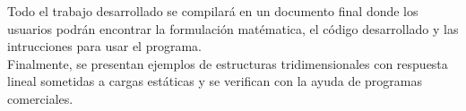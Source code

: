 Todo el trabajo desarrollado se compilará en un documento final donde los usuarios podrán encontrar la formulación matématica, el código desarrollado y las intrucciones para usar el programa. \\

Finalmente, se presentan ejemplos de estructuras tridimensionales con respuesta lineal sometidas a cargas estáticas y se verifican con la ayuda de programas comerciales.




